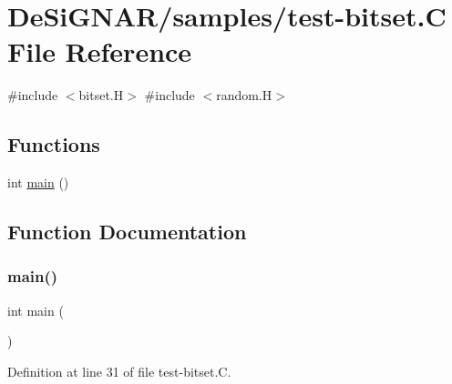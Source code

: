 \hypertarget{test-bitset_8_c}{}\section{De\+Si\+G\+N\+A\+R/samples/test-\/bitset.C File Reference}
\label{test-bitset_8_c}
{\ttfamily \#include $<$bitset.\+H$>$}\newline
{\ttfamily \#include $<$random.\+H$>$}\newline
\subsection*{Functions}
\begin{DoxyCompactItemize}
\item 
int \hyperlink{test-bitset_8_c_ae66f6b31b5ad750f1fe042a706a4e3d4}{main} ()
\end{DoxyCompactItemize}


\subsection{Function Documentation}
\mbox{\label{test-bitset_8_c_ae66f6b31b5ad750f1fe042a706a4e3d4}} 
\subsubsection{\texorpdfstring{main()}{main()}}
{\footnotesize\ttfamily int main (\begin{DoxyParamCaption}{ }\end{DoxyParamCaption})}



Definition at line 31 of file test-\/bitset.\+C.

